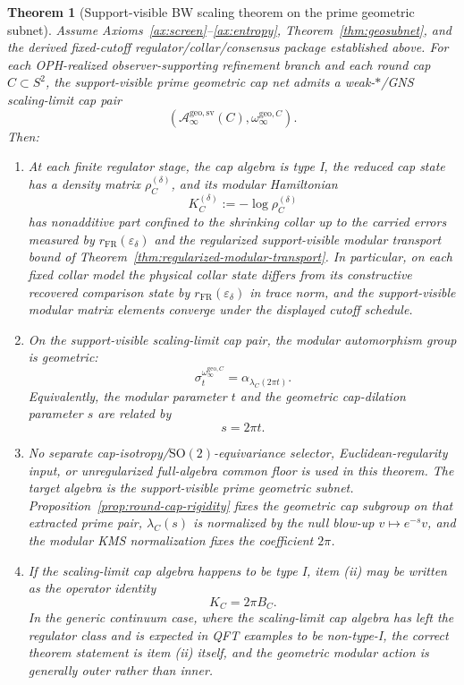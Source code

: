 \documentclass[11pt]{article}
\newtheorem{theorem}{Theorem}[section]
\begin{document}
\begin{theorem}[Support-visible BW scaling theorem on the prime geometric subnet]\label{thm:bw}
Assume Axioms~\ref{ax:screen}--\ref{ax:entropy}, Theorem~\ref{thm:geosubnet}, and the derived fixed-cutoff regulator/collar/consensus package established above. For each OPH-realized observer-supporting refinement branch and each round cap \(C\subset S^2\), the support-visible prime geometric cap net admits a weak-\(*\)/GNS scaling-limit cap pair
\[
(\mathcal A_\infty^{\mathrm{geo,sv}}(C),\omega_\infty^{\mathrm{geo},C}).
\]
Then:
\begin{enumerate}[label=\textup{(\roman*)},leftmargin=2em]
\item At each finite regulator stage, the cap algebra is type I, the reduced cap state has a density matrix \(\rho_C^{(\delta)}\), and its modular Hamiltonian
\[
K_C^{(\delta)}:=-\log \rho_C^{(\delta)}
\]
has nonadditive part confined to the shrinking collar up to the carried errors measured by \(r_{\mathrm{FR}}(\varepsilon_\delta)\) and the regularized support-visible modular transport bound of Theorem~\ref{thm:regularized-modular-transport}. In particular, on each fixed collar model the physical collar state differs from its constructive recovered comparison state by \(r_{\mathrm{FR}}(\varepsilon_\delta)\) in trace norm, and the support-visible modular matrix elements converge under the displayed cutoff schedule.

\item On the support-visible scaling-limit cap pair, the modular automorphism group is geometric:
\[
\sigma_t^{\omega_\infty^{\mathrm{geo},C}}
=
\alpha_{\lambda_C(2\pi t)}.
\]
Equivalently, the modular parameter \(t\) and the geometric cap-dilation parameter \(s\) are related by
\[
s=2\pi t.
\]

\item No separate cap-isotropy/\(\mathrm{SO}(2)\)-equivariance selector, Euclidean-regularity input, or unregularized full-algebra common floor is used in this theorem. The target algebra is the support-visible prime geometric subnet. Proposition~\ref{prop:round-cap-rigidity} fixes the geometric cap subgroup on that extracted prime pair, \(\lambda_C(s)\) is normalized by the null blow-up \(v\mapsto e^{-s}v\), and the modular KMS normalization fixes the coefficient \(2\pi\).

\item If the scaling-limit cap algebra happens to be type I, item \textup{(ii)} may be written as the operator identity
\[
K_C=2\pi B_C.
\]
In the generic continuum case, where the scaling-limit cap algebra has left the regulator class and is expected in QFT examples to be non-type-I, the correct theorem statement is item \textup{(ii)} itself, and the geometric modular action is generally outer rather than inner.
\end{enumerate}


\end{theorem}
\end{document}

